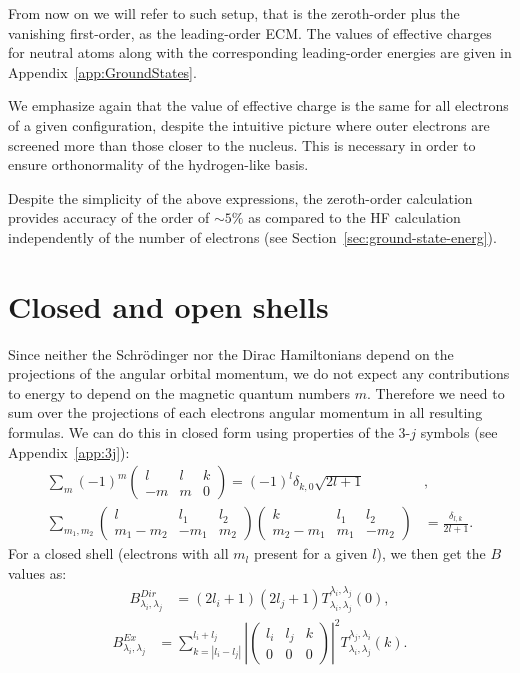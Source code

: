 From now on we will refer to such setup, that is the zeroth-order plus the vanishing first-order, as the leading-order ECM. The values of effective charges for neutral atoms along with the corresponding leading-order energies are given in Appendix~\ref{app:GroundStates}.

We emphasize again that the value of effective charge is the same for all electrons of a given configuration, despite the intuitive picture where outer electrons are screened more than those closer to the nucleus. This is necessary in order to ensure orthonormality of the hydrogen-like basis.

Despite the simplicity of the above expressions, the zeroth-order calculation provides accuracy of the order of $\sim 5\%$ as compared to the HF calculation independently of the number of electrons (see Section~\ref{sec:ground-state-energ}). 

\section{Closed and open shells}

Since neither the Schr\"odinger nor the Dirac Hamiltonians depend on the projections of the angular orbital momentum, we do not expect any contributions to energy to depend on the magnetic quantum numbers $m$. Therefore we need to sum over the projections of each electrons angular momentum in all resulting formulas. We can do this in closed form using properties of the 3-$j$ symbols (see Appendix~\ref{app:3j}):
\begin{align} \label{3jProps}
    \sum_m (-1)^m\begin{pmatrix} l & l & k \\ -m & m & 0\end{pmatrix} = (-1)^l\delta_{k,0}\sqrt{2l+1}&,\\
    \sum_{m_1,m_2}
    \begin{pmatrix} l & l_1 & l_2 \\ m_1-m_2 & -m_1 & m_2 \end{pmatrix}
    \begin{pmatrix} k & l_1 & l_2 \\ m_2-m_1 & m_1 & -m_2 \end{pmatrix}
   & = \frac{\delta_{l,k}}{2l+1}.
\end{align}
For a closed shell (electrons with all $m_l$ present for a given $l$), we then get the $B$ values as:
\begin{align}
    B^{Dir}_{\lambda_i,\lambda_j} &= (2l_i+1)(2l_j+1) T^{\lambda_i,\lambda_j}_{\lambda_i,\lambda_j}(0),
\end{align}
\begin{align}
    B^{Ex}_{\lambda_i,\lambda_j} &= \sum_{k=|l_i-l_j|}^{l_i+l_j}
    \left| \begin{pmatrix} l_i & l_j & k \\ 0 & 0 & 0\end{pmatrix}\right|^2
T^{\lambda_j,\lambda_i}_{\lambda_i,\lambda_j}(k).
\end{align}

